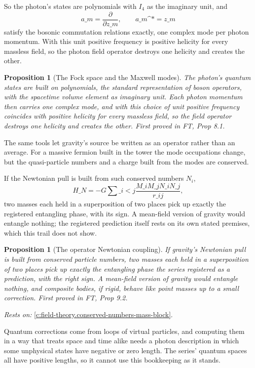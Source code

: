 \documentclass[11pt]{article}
\newtheorem{proposition}[theorem]{Proposition}
\theoremstyle{definition}
\theoremstyle{plain}
\begin{document}
So the photon's states are polynomials with $I_4$ as the imaginary unit, and \[ a\_m = \frac{\partial}{\partial z\_m} , \qquad a\_m\^{}* = z\_m \] satisfy the bosonic commutation relations exactly, one complex mode per photon momentum. With this unit positive frequency is positive helicity for every massless field, so the photon field operator destroys one helicity and creates the other.

\begin{proposition}[The Fock space and the Maxwell modes]\label{c:field-theory.fock-space-maxwell-modes}
The photon's quantum states are built on polynomials, the standard representation of boson operators, with the spacetime volume element as imaginary unit. Each photon momentum then carries one complex mode, and with this choice of unit positive frequency coincides with positive helicity for every massless field, so the field operator destroys one helicity and creates the other.
\emph{First proved in} FT, Prop 8.1.
\end{proposition}

The same tools let gravity's source be written as an operator rather than an average. For a massive fermion built in the tower the mode occupations change, but the quasi-particle numbers and a charge built from the modes are conserved.

If the Newtonian pull is built from such conserved numbers $N_i$, \[ H\_N = -G\sum\_{i<j}\frac{M\_iM\_jN\_iN\_j}{r\_{ij}} , \] two masses each held in a superposition of two places pick up exactly the registered entangling phase, with its sign. A mean-field version of gravity would entangle nothing; the registered prediction itself rests on its own stated premises, which this trail does not show.

\begin{proposition}[The operator Newtonian coupling]\label{c:field-theory.operator-newtonian-coupling}
If gravity's Newtonian pull is built from conserved particle numbers, two masses each held in a superposition of two places pick up exactly the entangling phase the series registered as a prediction, with the right sign. A mean-field version of gravity would entangle nothing, and composite bodies, if rigid, behave like point masses up to a small correction.
\emph{First proved in} FT, Prop 9.2.
\end{proposition}
\noindent\emph{Rests on:} \ref{c:field-theory.conserved-numbers-mass-block}.

Quantum corrections come from loops of virtual particles, and computing them in a way that treats space and time alike needs a photon description in which some unphysical states have negative or zero length. The series' quantum spaces all have positive lengths, so it cannot use this bookkeeping as it stands.
\end{document}
